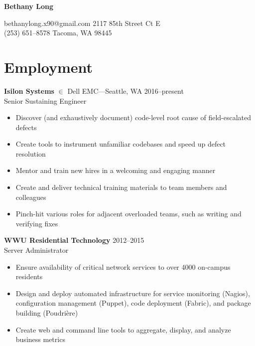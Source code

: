 \documentclass[11pt, letterpaper]{article}
\begin{document}
\clearpage
\thispagestyle{empty}

\begin{center}
\textbf{\huge{Bethany Long}}%
\end{center}

\small{
bethanylong.x90@gmail.com \hfill 2117 85th Street Ct E\\
(253) 651--8578 \hfill Tacoma, WA 98445}

\hrulefill

\section*{Employment}

\textbf{Isilon Systems} \(\in\) Dell EMC---Seattle, WA \hfill 2016--present\\
Senior Sustaining Engineer

\begin{itemize}
    \item Discover (and exhaustively document) code-level root cause of field-escalated defects
    \item Create tools to instrument unfamiliar codebases and speed up defect resolution
    \item Mentor and train new hires in a welcoming and engaging manner
    \item Create and deliver technical training materials to team members and colleagues
    \item Pinch-hit various roles for adjacent overloaded teams, such as writing and verifying fixes
\end{itemize}

\bigskip

\textbf{WWU Residential Technology} \hfill 2012--2015\\
Server Administrator

\begin{itemize}
    \item Ensure availability of critical network services to over 4000 on-campus residents
    \item Design and deploy automated infrastructure for service monitoring (Nagios), configuration management (Puppet), code deployment (Fabric), and package building (Poudri\`{e}re)
    \item Create web and command line tools to aggregate, display, and analyze business metrics
\end{itemize}

\bigskip
\end{document}
